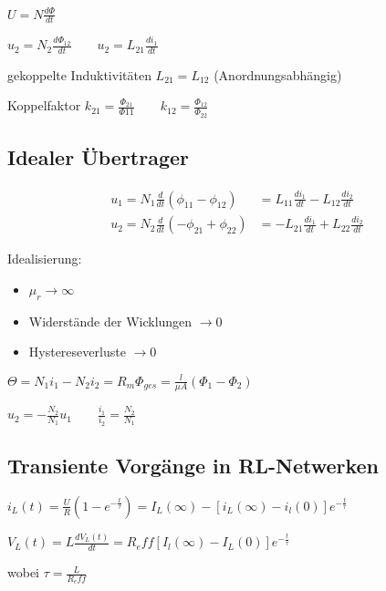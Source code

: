 \documentclass[10pt,a4paper]{scrartcl}
\begin{document}
\begin{multicols*}{3}
	$U=N\frac{d\Phi}{dt}$
	
	$u_2=N_2\frac{d\Phi_{12}}{dt}\qquad u_2=L_{21}\frac{di_1}{dt}$
	
	gekoppelte Induktivitäten $L_{21}=L_{12}$ \scriptsize (Anordnungsabhängig)\normalsize
	
	Koppelfaktor $k_{21}=\frac{\Phi_{21}}{\Phi{11}}\qquad k_{12}=\frac{\Phi_{12}}{\Phi_{22}}$
	
	
	 
	
	\subsection{Idealer Übertrager}
	
		
	\begin{align*}
	u_1=N_1\frac{d}{dt}(\phi_{11}-\phi_{12})&=L_{11}\frac{di_1}{dt}-L_{12}\frac{di_2}{dt}\\	
	u_2=N_2\frac{d}{dt}(-\phi_{21}+\phi_{22})&=-L_{21}\frac{di_1}{dt}+L_{22}\frac{di_2}{dt}
	\end{align*}
	
	Idealisierung:
	
	\begin{itemize}
	\compaq
	\item
	$\mu_r\rightarrow\infty$
	\item
	Widerstände der Wicklungen $\rightarrow 0$
	\item
	Hystereseverluste $\rightarrow 0$
	\end{itemize}
	
	$\Theta = N_1i_1-N_2i_2=R_m\Phi_{ges}=\frac{l}{\mu A}(\Phi_1-\Phi_2)$
	
	$u_2=-\frac{N_2}{N_1}u_1\qquad \frac{i_1}{i_2}=\frac{N_2}{N_1}$
	
	
	
	 
	
	\subsection{Transiente Vorgänge in RL-Netwerken}
	
	$i_L(t)=\frac{U}{R}(1-e^{-\frac{t}{\tau}})=I_L(\infty)-[i_L(\infty)-i_l(0)]e^{-\frac{t}{\tau}}$
	
	$V_L(t)=L\frac{dV_L(t)}{dt}=R_eff[I_l(\infty)-I_L(0)]e^{-\frac{t}{\tau}}$
	
	wobei $\tau = \frac{L}{R_eff}$
	

\end{multicols*}
\end{document}
